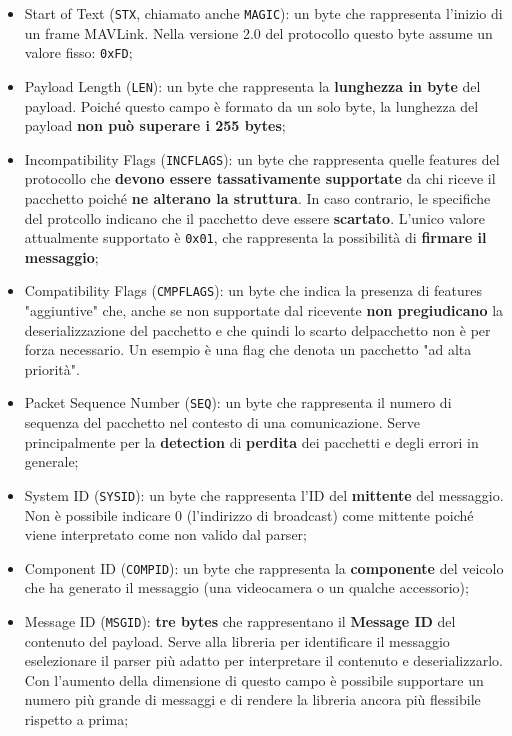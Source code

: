 \documentclass[a4paper, 12pt, oneside]{article}
\theoremstyle{definition}
\begin{document}
\begin{itemize}
    \item Start of Text (\texttt{STX}, chiamato anche \texttt{MAGIC}): un byte che rappresenta l'inizio di un frame MAVLink. Nella versione 2.0 del protocollo questo byte assume un valore fisso: \texttt{0xFD};
    \item Payload Length (\texttt{LEN}): un byte che rappresenta la \textbf{lunghezza in byte} del payload. Poiché questo campo è formato da un solo byte, la lunghezza del payload \textbf{non può superare i 255 bytes};
    \item Incompatibility Flags (\texttt{INCFLAGS}): un byte che rappresenta quelle features del protocollo che \textbf{devono essere tassativamente supportate} da chi riceve il pacchetto poiché \textbf{ne alterano la struttura}. In caso contrario, le specifiche del protcollo indicano che il pacchetto deve essere \textbf{scartato}. L'unico valore attualmente supportato è \texttt{0x01}, che rappresenta la possibilità di \textbf{firmare il messaggio};
    \item Compatibility Flags (\texttt{CMPFLAGS}): un byte che indica la presenza di features "aggiuntive" che, anche se non supportate dal ricevente \textbf{non pregiudicano} la deserializzazione del pacchetto e che quindi lo scarto delpacchetto non è per forza necessario. Un esempio è una flag che denota un pacchetto "ad alta priorità".
    \item Packet Sequence Number (\texttt{SEQ}): un byte che rappresenta il numero di sequenza del pacchetto nel contesto di una comunicazione. Serve principalmente per la \textbf{detection} di \textbf{perdita} dei pacchetti e degli errori in generale;
    \item System ID (\texttt{SYSID}): un byte che rappresenta l'ID del \textbf{mittente} del messaggio. Non è possibile indicare 0 (l'indirizzo di broadcast) come mittente poiché viene interpretato come non valido dal parser;
    \item Component ID (\texttt{COMPID}): un byte che rappresenta la \textbf{componente} del veicolo che ha generato il messaggio (una videocamera o un qualche accessorio);
    \item Message ID (\texttt{MSGID}): \textbf{tre bytes} che rappresentano il \textbf{Message ID} del contenuto del payload. Serve alla libreria per identificare il messaggio eselezionare il parser più adatto per interpretare il contenuto e deserializzarlo. Con l'aumento della dimensione di questo campo è possibile supportare un numero più grande di messaggi e di rendere la libreria ancora più flessibile rispetto a prima;

\end{itemize}
\end{document}
